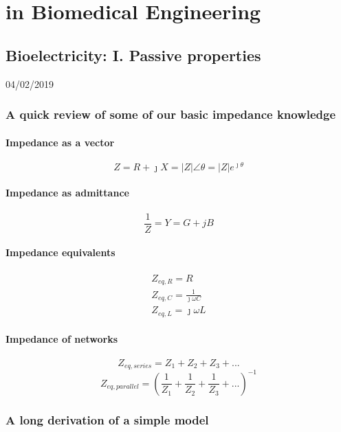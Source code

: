 \documentclass[11pt]{book}
\begin{document}
\part{in Biomedical Engineering}

\chapter{Bioelectricity: I. Passive properties}
04/02/2019 
\minitoc
\newpage
\section{A quick review of some of our basic impedance knowledge}
\subsection{Impedance as a vector}
\begin{equation}
	Z = R + \jmath X = |Z|\angle \theta = |Z|e^{\jmath\theta}  
\end{equation}
\subsection{Impedance as admittance}
\begin{equation}
	\frac{1}{Z} = Y = G + jB
\end{equation}
\subsection{Impedance equivalents}
\begin{eqnarray}
	Z_{eq,R}= R \\
	Z_{eq,C} = \frac{1}{\jmath \omega C} \\
	Z_{eq,L} = \jmath \omega L
\end{eqnarray}
\subsection{Impedance of networks}
\begin{equation}
	Z_{eq,series} = Z_1 + Z_2 + Z_3 + ...
\end{equation}
\begin{equation}
	Z_{eq,parallel} = \left(\frac{1}{Z_1}+ \frac{1}{Z_2}+ \frac{1}{Z_3} + ...\right)^{-1}
\end{equation}

\section{A long derivation of a simple model}
\end{document}
